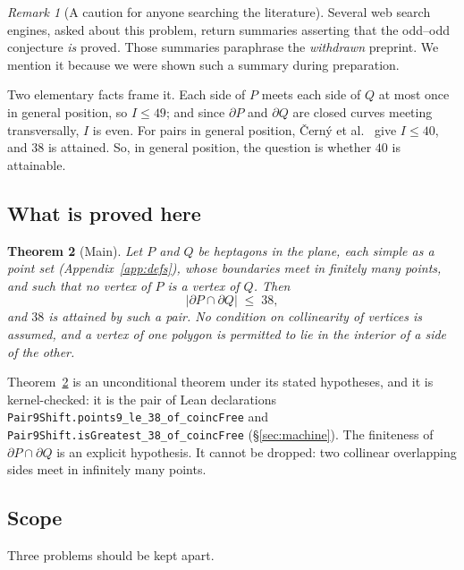 \documentclass[11pt,a4paper]{article}
\theoremstyle{plain}
\newtheorem{theorem}{Theorem}[section]
\theoremstyle{definition}
\theoremstyle{remark}
\newtheorem{remark}[theorem]{Remark}
\begin{document}
\begin{remark}[A caution for anyone searching the literature]
Several web search engines, asked about this problem, return summaries
asserting that the odd--odd conjecture \emph{is} proved. Those summaries
paraphrase the \emph{withdrawn} preprint. We mention it because we were
shown such a summary during preparation.
\end{remark}

Two elementary facts frame it. Each side of $P$ meets each side of $Q$ at most
once in general position, so $I\le 49$; and since $\partial P$ and $\partial Q$
are closed curves meeting transversally, $I$ is even. For pairs in general
position, \v{C}ern\'y et al.~\cite{CernyEtAl2003} give $I\le 40$, and $38$ is
attained. So, in general position, the question is whether $40$ is attainable.

\subsection{What is proved here}

\begin{theorem}[Main]\label{thm:main}
Let $P$ and $Q$ be heptagons in the plane, each simple as a point set
(Appendix~\ref{app:defs}), whose boundaries meet in finitely many points, and
such that \emph{no vertex of $P$ is a vertex of $Q$}. Then
\[
  \lvert \partial P \cap \partial Q\rvert \;\le\; 38 ,
\]
and $38$ is attained by such a pair. No condition on collinearity of vertices
is assumed, and a vertex of one polygon \emph{is} permitted to lie in the
interior of a side of the other.
\end{theorem}

\begin{sloppypar}
Theorem~\ref{thm:main} is an unconditional theorem under its stated
hypotheses, and it is kernel-checked: it is the pair of Lean declarations
\texttt{Pair9Shift.\allowbreak points9\_le\_38\_of\_coincFree} and
\texttt{Pair9Shift.\allowbreak isGreatest\_38\_of\_coincFree}
(\S\ref{sec:machine}). The finiteness of $\partial P\cap\partial Q$ is an
explicit hypothesis. It cannot be dropped: two collinear overlapping sides meet
in infinitely many points.
\end{sloppypar}

\subsection{Scope}\label{sec:scope}

Three problems should be kept apart.
\end{document}
